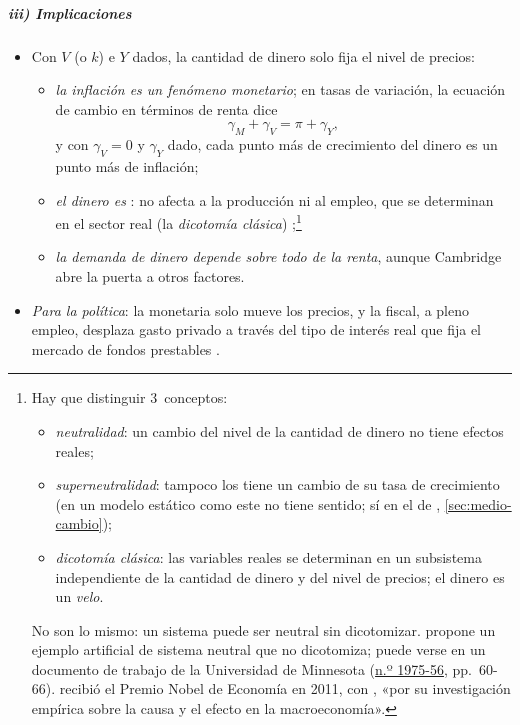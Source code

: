 \documentclass[11pt]{article}
\begin{document}
\subparagraph{iii) Implicaciones}

\begin{itemize}
\item Con $V$ (o $k$) e $Y$ dados, la cantidad de dinero solo fija el nivel de precios:
  \begin{itemize}
  \item \emph{la inflación es un fenómeno monetario}; en tasas de variación, la ecuación de cambio en términos de renta dice
    \begin{equation}
    \gamma_M+\gamma_V=\pi+\gamma_Y, \label{eq:cuantitativa-tasas}
    \end{equation}
    y con $\gamma_V=0$ y $\gamma_Y$ dado, cada punto más de crecimiento del dinero es un punto más de inflación;
  \item \emph{el dinero es }: no afecta a la producción ni al empleo, que se determinan en el sector real (la \emph{dicotomía clásica}) ;\footnote{Hay que distinguir 3~conceptos\nocite{Serletis2007Demand}:
\begin{itemize}
\item \emph{neutralidad}: un cambio del nivel de la cantidad de dinero no tiene efectos reales;
\item \emph{superneutralidad}: tampoco los tiene un cambio de su tasa de crecimiento (en un modelo estático como este no tiene sentido; sí en el de , \ref{sec:medio-cambio});
\item \emph{dicotomía clásica}: las variables reales se determinan en un subsistema independiente de la cantidad de dinero y del nivel de precios; el dinero es un \emph{velo}.
\end{itemize}
No son lo mismo: un sistema puede ser neutral sin dicotomizar.  propone un ejemplo artificial de sistema neutral que no dicotomiza; puede verse en un documento de trabajo de la Universidad de Minnesota (\href{https://hdl.handle.net/11299/54808}{n.º 1975-56}, pp.~60-66).  recibió el Premio Nobel de Economía en 2011, con , «por su investigación empírica sobre la causa y el efecto en la macroeconomía»\nocite{Nobel2011SargentSims}.}
  \item \emph{la demanda de dinero depende sobre todo de la renta}, aunque Cambridge abre la puerta a otros factores.
  \end{itemize}
\item \emph{Para la política}: la monetaria solo mueve los precios, y la fiscal, a pleno empleo, desplaza gasto privado a través del tipo de interés real que fija el mercado de fondos prestables .
\end{itemize}
\end{document}
